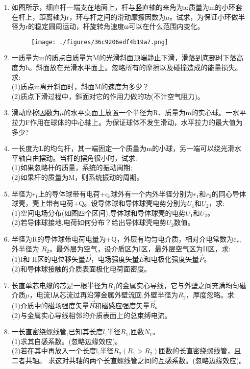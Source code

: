 \begin{enumerate}
\item 如图所示，细直杆一端支在地面上，杆与竖直轴的来角为a:质量为m的小环套在杆上，距离轴为r，环与杆之间的滑动摩擦因数为$\mu$。试求，为保证小环做半径为r的稳定圆周运动，杆旋转角速度ω可以在什么范围内变化。
\begin{figure}[ht]
\centering
\texttt{[image: ./figures/36c9206edf4b19a7.png]}
\caption{} \label{fig_SSD11_1}
\end{figure}
\item 一质量为m的质点自质量为M的光滑斜面顶端静止下滑，滑落到底部时下落高度为h。斜面放在光滑水平面上。忽略所有的摩擦以及碰撞造成的能量损失。求:\\
(1)质点m离开斜面时，斜面M的速度为多少？\\
(2)质点下滑过程中，斜面对它的作用力做的功(不计空气阻力)。
\item 滑动摩擦因数为$\mu$的水平桌面上放置一个半径为R、质量为m的实心球。一水平拉力F作用在球体的中心轴上。为保证球体不发生滑动，水平拉力的最大值为多少?
\item 一长度为L的均匀杆，其一端固定一个质量为m的小球，另一端可以绕光滑水平轴自由摆动。当杆的摆角很小时，试求:\\
(1)如果忽略杆的质量，系统的振动周期;\\
(2)如果杆的质量为M，则系统振动的周期。
\item 半径为$r_1$上的导体球带有电荷+q,球外有一个内外半径分别为$r_1$和$r_2$的同心导体球壳，壳上带有电荷+Q。设导体球和导体球壳电势分别为$U_1$和$U_2$，求:\\
(1)空间电场分布(如图四个区间),导体球和导体球壳的电势$U_1$和$U_2$。\\
(2)若导体球接地,电荷如何分布？给出导体球壳电势$U_2$数值。
\item 半径为R的导体球带电荷电量为+Q，外层有均匀电介质，相对介电常数为$\varepsilon_r$,外半径为 $R_2$。最外层为空气，设介质区为I区，最外层空气区为II区，求:\\
(1)I和 II区的电位移矢量$\vec D$，电场强度矢量$\vec E$和电极化强度矢量$\vec P$。\\
(2)和导体球接触的介质表面极化电荷面密度。
\item 长直单芯电缆的芯是一根半径为$ R_1$的金属实心导线，它与外壁之间充满均匀磁介质$\mu$，电流I从芯流过再沿薄金属外壁流回,外壁半径为$R_2$，厚度忽略。求:\\
(1)介质中的磁场强度矢量$\vec H$和磁感应强度矢量$\vec B$。\\
(2)与金属实心导线相邻的介质表面上的总束缚电流。
\item 一长直密绕螺线管,已知其长度$l$,半径$R_1$,匝数$N_1$。\\
(1)求其自感系数。(忽略边缘效应)。\\
(2)若在其中再放入一个长度l,半径$R_2(R_1>R_2)$匝数的长直密绕螺线管，且二者共轴。
求这对共轴的两个长直螺线管之间的互感系数。(忽略边缘效应)。
\end{enumerate}
